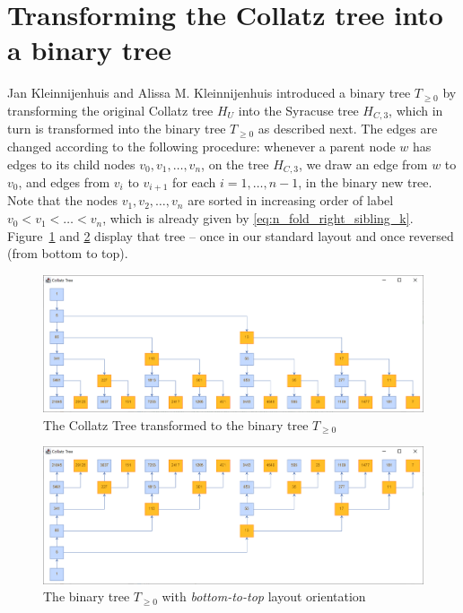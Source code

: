 \section{Transforming the Collatz tree into a binary tree}
Jan Kleinnijenhuis and Alissa M. Kleinnijenhuis \cite{Ref_Kleinnijenhuis_2020a} introduced a binary tree $T_{\ge0}$ by transforming the original Collatz tree $H_U$ into the Syracuse tree $H_{C,3}$, which in turn is transformed into the binary tree $T_{\ge0}$ as described next. The edges are changed according to the following procedure: whenever a parent node $w$ has edges to its child nodes $v_0,v_1,\ldots,v_n$, on the tree $H_{C,3}$, we draw an edge from $w$ to $v_0$, and edges from $v_i$ to $v_{i+1}$ for each $i=1,\ldots,n-1$, in the binary new tree. Note that the nodes $v_1,v_2,\ldots,v_n$ are sorted in increasing order of label $v_0<v_1<\ldots<v_n$, which is already given by \ref{eq:n_fold_right_sibling_k}. Figure~\ref{fig:bt3} and \ref{fig:bt3_rot} display that tree -- once in our standard layout and once reversed (from bottom to top).

\begin{figure}[H]
	\includegraphics[width=1.00\textwidth]{figures/bt_3_t0.png}
	\caption{The Collatz Tree transformed to the binary tree $T_{\ge0}$}
	\label{fig:bt3}
\end{figure}

\vspace{-2em}
\begin{figure}[H]
	\includegraphics[width=1.00\textwidth]{figures/bt_3_t0_rot.png}
	\caption{The binary tree $T_{\ge0}$ with \textit{bottom-to-top} layout orientation}
	\label{fig:bt3_rot}
\end{figure}


